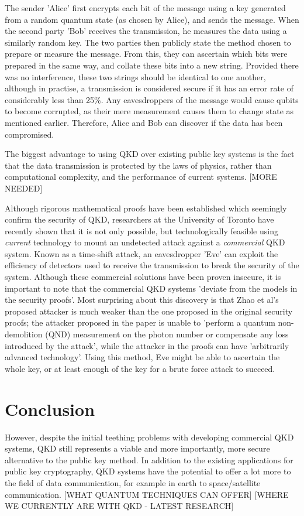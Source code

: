 \documentclass[runningheads,a4paper]{llncs}
\begin{document}
The sender 'Alice' first encrypts each bit of the message using a key generated from a random quantum state (as chosen by Alice), and sends the message. When the second party 'Bob' receives the transmission, he measures the data using a similarly random key. The two parties then publicly state the method chosen to prepare or measure the message. From this, they can ascertain which bits were prepared in the same way, and collate these bits into a new string. Provided there was no interference, these two strings should be identical to one another, although in practise, a transmission is considered secure if it has an error rate of considerably less than 25\%\cite{Steane:1997zr}. Any eavesdroppers of the message would cause qubits to become corrupted, as their mere measurement causes them to change state as mentioned earlier. Therefore, Alice and Bob can discover if the data has been compromised.

The biggest advantage to using QKD over existing public key systems is the fact that the data transmission is protected by the laws of physics, rather than computational complexity, and the performance of current systems. [MORE NEEDED]

Although rigorous mathematical proofs have been established which seemingly confirm the security of QKD\cite{Deutsch:1996fk}\cite{Shor:2000uq}, researchers at the University of Toronto have recently shown that it is not only possible, but technologically feasible using \emph{current} technology to mount an undetected attack against a \emph{commercial} QKD system. Known as a time-shift attack, an eavesdropper 'Eve' can exploit the efficiency of detectors used to receive the transmission to break the security of the system\cite{Zhao:2008fk}. Although these commercial solutions have been proven insecure, it is important to note that the commercial QKD systems 'deviate from the models in the security proofs'\cite{Lydersen:2010qy}. Most surprising about this discovery is that Zhao et al's proposed attacker is much weaker than the one proposed in the original security proofs; the attacker proposed in the paper is unable to 'perform a quantum non-demolition (QND) measurement on the photon number or compensate any loss introduced by the attack', while the attacker in the proofs can have 'arbitrarily advanced technology'. Using this method, Eve might be able to ascertain the whole key, or at least enough of the key for a brute force attack to succeed.

\section{Conclusion}

However, despite the initial teething problems with developing commercial QKD systems, QKD still represents a viable and more importantly, more secure alternative to the public key method. In addition to the existing applications for public key cryptography, QKD systems have the potential to offer a lot more to the field of data communication, for example in earth to space/satellite communication\cite{Hughes:2000uq}. [WHAT QUANTUM TECHNIQUES CAN OFFER] [WHERE WE CURRENTLY ARE WITH QKD - LATEST RESEARCH]



\end{document}
